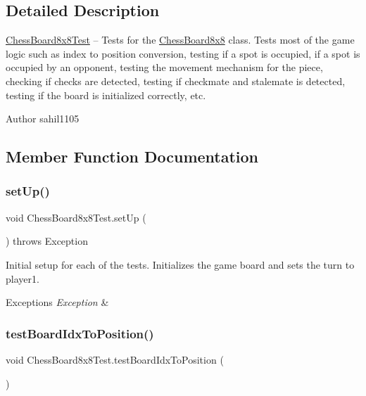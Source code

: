 \subsection{Detailed Description}
\mbox{\hyperlink{class_chess_board8x8_test}{Chess\+Board8x8\+Test}} -- Tests for the \mbox{\hyperlink{class_chess_board8x8}{Chess\+Board8x8}} class. Tests most of the game logic such as index to position conversion, testing if a spot is occupied, if a spot is occupied by an opponent, testing the movement mechanism for the piece, checking if \textquotesingle{}checks\textquotesingle{} are detected, testing if checkmate and stalemate is detected, testing if the board is initialized correctly, etc. \begin{DoxyAuthor}{Author}
sahil1105 
\end{DoxyAuthor}


\subsection{Member Function Documentation}
\mbox{\label{class_chess_board8x8_test_afebde4bbc3c2605a554bb3e974108969}} 
\subsubsection{\texorpdfstring{set\+Up()}{setUp()}}
{\footnotesize\ttfamily void Chess\+Board8x8\+Test.\+set\+Up (\begin{DoxyParamCaption}{ }\end{DoxyParamCaption}) throws Exception}

Initial setup for each of the tests. Initializes the game board and sets the turn to player1. 
\begin{DoxyExceptions}{Exceptions}
{\em Exception} & \\
\hline
\end{DoxyExceptions}
\mbox{\label{class_chess_board8x8_test_a03828a60620e811e0ec03c473349b27e}} 
\subsubsection{\texorpdfstring{test\+Board\+Idx\+To\+Position()}{testBoardIdxToPosition()}}
{\footnotesize\ttfamily void Chess\+Board8x8\+Test.\+test\+Board\+Idx\+To\+Position (\begin{DoxyParamCaption}{ }\end{DoxyParamCaption})}

